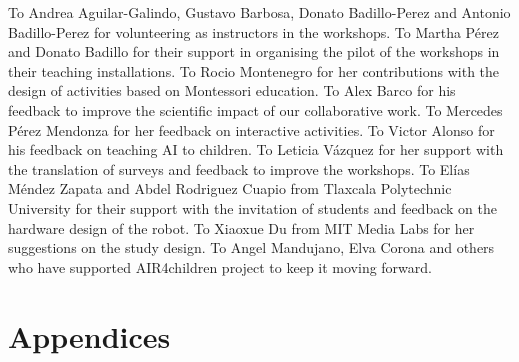\documentclass[sigconf]{acmart}
\begin{document}
\begin{acks}
To Andrea Aguilar-Galindo, Gustavo Barbosa, Donato Badillo-Perez and Antonio Badillo-Perez for volunteering as instructors in the workshops.
To Martha P\'erez and Donato Badillo for their support in organising the pilot of the workshops in their teaching installations. 
To Rocio Montenegro for her contributions with the design of activities based on Montessori education.
To Alex Barco for his feedback to improve the scientific impact of our collaborative work.
To Mercedes P\'erez Mendonza for her feedback on interactive activities.
To Victor Alonso for his feedback on teaching AI to children. 
To Leticia V\'azquez for her support with the translation of surveys and feedback to improve the workshops.
To El\'ias M\'endez Zapata and Abdel Rodriguez Cuapio from Tlaxcala Polytechnic University for their support with the invitation of students and feedback on the hardware design of the robot.
To Xiaoxue Du from MIT Media Labs for her suggestions on the study design. 
To Angel Mandujano, Elva Corona and others who have supported AIR4children project to keep it moving forward. 
\end{acks}




\newpage

\section*{Appendices}
\appendix
\end{document}
